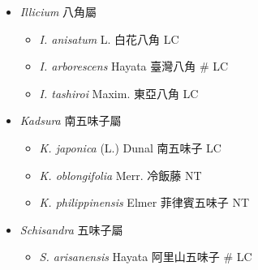 
  \begin{itemize}
 \item[] \textit{Illicium} 八角屬
                                
  \begin{itemize}
        \item[] \textit{I. anisatum} L.  白花八角   LC
        \item[] \textit{I. arborescens} Hayata  臺灣八角  \# LC
        \item[] \textit{I. tashiroi} Maxim.  東亞八角   LC
  \end{itemize}
 \item[] \textit{Kadsura} 南五味子屬
                                
  \begin{itemize}
        \item[] \textit{K. japonica} (L.) Dunal  南五味子   LC
        \item[] \textit{K. oblongifolia} Merr.  冷飯藤   NT
        \item[] \textit{K. philippinensis} Elmer  菲律賓五味子   NT
  \end{itemize}
 \item[] \textit{Schisandra} 五味子屬
                                
  \begin{itemize}
        \item[] \textit{S. arisanensis} Hayata  阿里山五味子  \# LC
  \end{itemize}
  \end{itemize}
